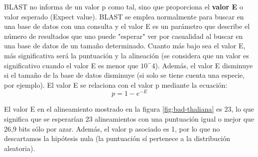 BLAST no informa de un valor p como tal, sino que proporciona el \textbf{valor E} o valor esperado (Expect value). BLAST se emplea normalmente para buscar en una base de datos con una consulta y el valor E es un parámetro que describe el número de resultados que uno puede "esperar" ver por casualidad al buscar en una base de datos de un tamaño determinado. Cuanto más bajo sea el valor E, más significativa será la puntuación y la alineación (se considera que un valor es significativo cuando el valor E es menor que $10^-4$). Además, el valor E disminuye si el tamaño de la base de datos disminuye (si solo se tiene cuenta una especie, por ejemplo). El valor E se relaciona con el valor p mediante la ecuación:
$$p = 1 - e^{-E}$$

El valor E en el alineamiento mostrado en la figura \ref{fig:bad-thaliana} es 23, lo que significa que se esperarían 23 alineamientos con una puntuación igual o mejor que 26,9 bits sólo por azar. Además, el valor p asociado es 1, por lo que no descartamos la hipótesis nula (la puntuación sí pertenece a la distribución aleatoria).

